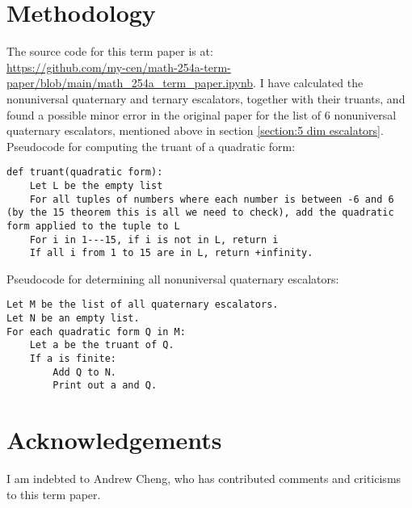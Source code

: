 \documentclass[letterpaper, 12pt]{article}
\begin{document}
\section{Methodology}
The source code for this term paper is at:\\\url{https://github.com/my-cen/math-254a-term-paper/blob/main/math_254a_term_paper.ipynb}.
I have calculated the nonuniversal quaternary and ternary escalators, together with their truants, and found a possible minor error in the original paper for the list of $6$ nonuniversal quaternary escalators, mentioned above in section \ref{section:5 dim escalators}. Pseudocode for computing the truant of a quadratic form:
\begin{verbatim}
def truant(quadratic form):
    Let L be the empty list
    For all tuples of numbers where each number is between -6 and 6 (by the 15 theorem this is all we need to check), add the quadratic form applied to the tuple to L
    For i in 1---15, if i is not in L, return i
    If all i from 1 to 15 are in L, return +infinity.
\end{verbatim}

Pseudocode for determining all nonuniversal quaternary escalators:
\begin{verbatim}
Let M be the list of all quaternary escalators.
Let N be an empty list.
For each quadratic form Q in M:
    Let a be the truant of Q.
    If a is finite:
        Add Q to N.
        Print out a and Q.
\end{verbatim}

\section{Acknowledgements}
I am indebted to Andrew Cheng, who has contributed comments and criticisms to this term paper.

\printbibliography
\end{document}
